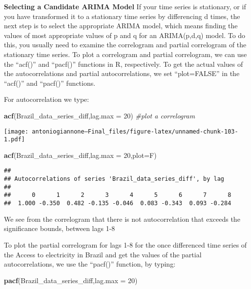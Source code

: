 \documentclass[
]{article}
\newenvironment{Shaded}{\begin{snugshade}}{\end{snugshade}}
\newcommand{\AttributeTok}[1]{\textcolor[rgb]{0.13,0.29,0.53}{#1}}
\newcommand{\CommentTok}[1]{\textcolor[rgb]{0.56,0.35,0.01}{\textit{#1}}}
\newcommand{\DecValTok}[1]{\textcolor[rgb]{0.00,0.00,0.81}{#1}}
\newcommand{\FunctionTok}[1]{\textcolor[rgb]{0.13,0.29,0.53}{\textbf{#1}}}
\newcommand{\NormalTok}[1]{#1}
\begin{document}
\textbf{Selecting a Candidate ARIMA Model} If your time series is
stationary, or if you have transformed it to a stationary time series by
differencing d times, the next step is to select the appropriate ARIMA
model, which means finding the values of most appropriate values of p
and q for an ARIMA(p,d,q) model. To do this, you usually need to examine
the correlogram and partial correlogram of the stationary time series.
To plot a correlogram and partial correlogram, we can use the ``acf()''
and ``pacf()'' functions in R, respectively. To get the actual values of
the autocorrelations and partial autocorrelations, we set ``plot=FALSE''
in the ``acf()'' and ``pacf()'' functions.

For autocorrelation we type:

\begin{Shaded}
\begin{Highlighting}[]
\FunctionTok{acf}\NormalTok{(Brazil\_data\_series\_diff,}\AttributeTok{lag.max =} \DecValTok{20}\NormalTok{)        }\CommentTok{\#plot a correlogram}
\end{Highlighting}
\end{Shaded}

\texttt{[image: antoniogiannone---Final\_files/figure-latex/unnamed-chunk-103-1.pdf]}

\begin{Shaded}
\begin{Highlighting}[]
\FunctionTok{acf}\NormalTok{(Brazil\_data\_series\_diff,}\AttributeTok{lag.max =} \DecValTok{20}\NormalTok{,}\AttributeTok{plot=}\NormalTok{F)}
\end{Highlighting}
\end{Shaded}

\begin{verbatim}
## 
## Autocorrelations of series 'Brazil_data_series_diff', by lag
## 
##      0      1      2      3      4      5      6      7      8 
##  1.000 -0.350  0.482 -0.135 -0.046  0.083 -0.343  0.093 -0.284
\end{verbatim}

We see from the correlogram that there is not autocorrelation that
exceeds the significance bounds, between lags 1-8

To plot the partial correlogram for lags 1-8 for the once differenced
time series of the Access to electricity in Brazil and get the values of
the partial autocorrelations, we use the ``pacf()'' function, by typing:

\begin{Shaded}
\begin{Highlighting}[]
\FunctionTok{pacf}\NormalTok{(Brazil\_data\_series\_diff,}\AttributeTok{lag.max =} \DecValTok{20}\NormalTok{)}
\end{Highlighting}
\end{Shaded}
\end{document}
